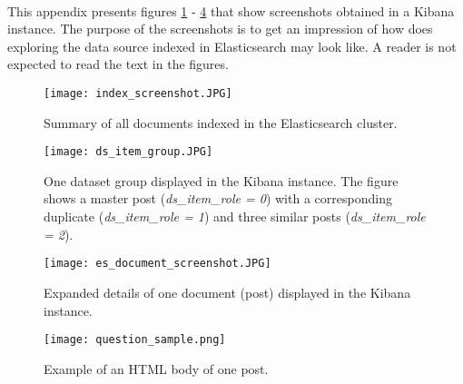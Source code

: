 \paragraph{}
This appendix presents figures \ref{index_summary} - \ref{question_sample} that show screenshots obtained in a Kibana instance. The purpose of the screenshots is to get an impression of how does exploring the data source indexed in Elasticsearch may look like. A reader is not expected to read the text in the figures.

\begin{figure}[!h]
	\texttt{[image: index\_screenshot.JPG]}
	\centering
	\caption{Summary of all documents indexed in the Elasticsearch cluster.}
	\label{index_summary}
\end{figure}

\begin{figure}[!h]
	\texttt{[image: ds\_item\_group.JPG]}
	\centering
	\caption{One dataset group displayed in the Kibana instance. The figure shows a master post (\textit{ds\_item\_role = 0}) with a corresponding duplicate (\textit{ds\_item\_role = 1}) and three similar posts (\textit{ds\_item\_role = 2}).}
	\label{ds_item_group}
\end{figure}


\begin{figure}[!h]
	\texttt{[image: es\_document\_screenshot.JPG]}
	\centering
	\caption{Expanded details of one document (post) displayed in the Kibana instance.}
	\label{es_document}
\end{figure}

\begin{figure}[!h]
	\texttt{[image: question\_sample.png]}
	\centering
	\caption{Example of an HTML body of one post.}
	\label{question_sample}
\end{figure}
